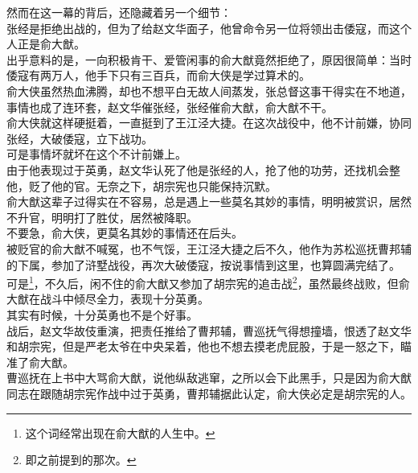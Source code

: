 \begin{multicols}{\theparacolNo}
然而在这一幕的背后，还隐藏着另一个细节：\\

张经是拒绝出战的，但为了给赵文华面子，他曾命令另一位将领出击倭寇，而这个人正是俞大猷。\\

出乎意料的是，一向积极肯干、爱管闲事的俞大猷竟然拒绝了，原因很简单：当时倭寇有两万人，他手下只有三百兵，而俞大侠是学过算术的。\\

俞大侠虽然热血沸腾，却也不想平白无故人间蒸发，张总督这事干得实在不地道，事情也成了连环套，赵文华催张经，张经催俞大猷，俞大猷不干。\\

俞大侠就这样硬挺着，一直挺到了王江泾大捷。在这次战役中，他不计前嫌，协同张经，大破倭寇，立下战功。\\

可是事情坏就坏在这个不计前嫌上。\\

由于他表现过于英勇，赵文华认死了他是张经的人，抢了他的功劳，还找机会整他，贬了他的官。无奈之下，胡宗宪也只能保持沉默。\\

俞大猷这辈子过得实在不容易，总是遇上一些莫名其妙的事情，明明被赏识，居然不升官，明明打了胜仗，居然被降职。\\

不要急，俞大侠，更莫名其妙的事情还在后头。\\

被贬官的俞大猷不喊冤，也不气馁，王江泾大捷之后不久，他作为苏松巡抚曹邦辅的下属，参加了浒墅战役，再次大破倭寇，按说事情到这里，也算圆满完结了。\\

可是\footnote{这个词经常出现在俞大猷的人生中。}，不久后，闲不住的俞大猷又参加了胡宗宪的追击战\footnote{即之前提到的那次。}，虽然最终战败，但俞大猷在战斗中倾尽全力，表现十分英勇。\\

其实有时候，十分英勇也不是个好事。\\

战后，赵文华故伎重演，把责任推给了曹邦辅，曹巡抚气得想撞墙，恨透了赵文华和胡宗宪，但是严老太爷在中央呆着，他也不想去摸老虎屁股，于是一怒之下，瞄准了俞大猷。\\

曹巡抚在上书中大骂俞大猷，说他纵敌逃窜，之所以会下此黑手，只是因为俞大猷同志在跟随胡宗宪作战中过于英勇，曹邦辅据此认定，俞大侠必定是胡宗宪的人。\\


\end{multicols}
